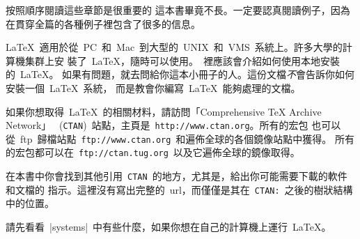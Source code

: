 \bigskip
\noindent 按照順序閱讀這些章節是很重要的
\pozhehao 這本書畢竟不長。一定要認真閱讀例子，因為在貫穿全篇的各種例子裡包含了很多的信息。%

\bigskip
\noindent
\LaTeX{}~適用於從~PC~和~Mac~到大型的~UNIX~和~VMS~系統上。許多大學的計算機集群上安
裝了~\LaTeX{}，隨時可以使用。\guide~裡應該會介紹如何使用本地安裝的~\LaTeX{}。
如果有問題，就去問給你這本小冊子的人。這份文檔\emph{不}會告訴你如何安裝一個~\LaTeX{}~系統，
而是教會你編寫~\LaTeX{}~能夠處理的文檔。

\bigskip
\noindent 如果你想取得~\LaTeX{}~的相關材料，請訪問「Comprehensive
\TeX{} Archive Network」
~(\texttt{CTAN})~站點，主頁是~\texttt{http://www.ctan.org}。所有的宏包
也可以從~ftp~歸檔站點~\texttt{ftp://www.ctan.org}~和遍佈全球的各個鏡像站點中獲得。
所有的宏包都可以在~\texttt{ftp://ctan.tug.org}~以及它遍佈全球的鏡像取得。

在本書中你會找到其他引用~\texttt{CTAN}~的地方，尤其是，給出你可能需要下載的軟件和文檔的
指示。這裡沒有寫出完整的~url，而僅僅是其在~\texttt{CTAN:}~之後的樹狀結構中的位置。%


請先看看~\CTAN|systems|~中有些什麼，如果你想在自己的計算機上運行~\LaTeX{}。%

